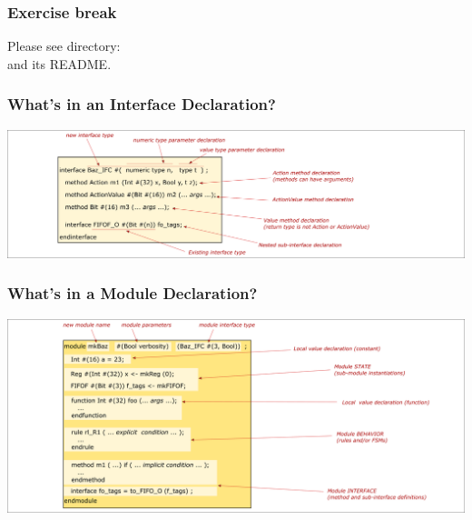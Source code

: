 
\begin{frame}
\frametitle{\EmojiExercise \hmm Exercise break}

Please see directory:  \\
and its README.

\end{frame}


\begin{frame}
\frametitle{What's in an Interface Declaration?}

\begin{center}
\includegraphics[width=\textwidth]{../Figures/Fig_BSV_whats_in_an_interface_decl}
\end{center}

\end{frame}


\begin{frame}
\frametitle{What's in a Module Declaration?}

\begin{center}
\includegraphics[width=\textwidth]{../Figures/Fig_BSV_whats_in_a_module_decl}
\end{center}

\end{frame}

